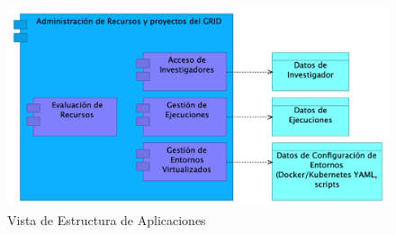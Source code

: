 \begin{figure}[H]
    \centering
    \includegraphics[width=\textwidth]{tablas-images/cp6/Application-Structure-View.png}
    \caption{Vista de Estructura de Aplicaciones}\label{fig:vista-estructura-aplicacion}
\end{figure}